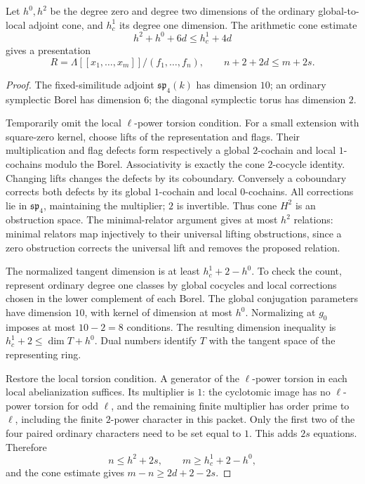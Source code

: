 \begin{srlemma}\label{lem:sr-four-presentation}
Let \(h^0,h^2\) be the degree zero and degree two dimensions of
the ordinary global-to-local adjoint cone, and \(h^1_c\) its
degree one dimension. The arithmetic cone estimate
\[
 h^2+h^0+6d\le h^1_c+4d
\]
gives a presentation
\[
 R=\Lambda[[x_1,\ldots,x_m]]/(f_1,\ldots,f_n),
 \qquad n+2+2d\le m+2s.
\]
\end{srlemma}
\begin{proof}
The fixed-similitude adjoint \(\mathfrak{sp}_4(k)\) has dimension
\(10\); an ordinary symplectic Borel has dimension \(6\);
the diagonal symplectic torus has dimension \(2\).

Temporarily omit the local \(\ell\)-power torsion condition.
For a small extension with square-zero kernel, choose lifts of
the representation and flags.
Their multiplication and flag defects form respectively a
global \(2\)-cochain and local \(1\)-cochains modulo the Borel.
Associativity is exactly the cone \(2\)-cocycle identity.
Changing lifts changes the defects by its coboundary.
Conversely a coboundary corrects both defects by its global
\(1\)-cochain and local \(0\)-cochains.
All corrections lie in \(\mathfrak{sp}_4\), maintaining the
multiplier; \(2\) is invertible.
Thus cone \(H^2\) is an obstruction space.
The minimal-relator argument gives at most \(h^2\) relations:
minimal relators map injectively to their universal lifting
obstructions, since a zero obstruction corrects the universal
lift and removes the proposed relation.

The normalized tangent dimension is at least \(h^1_c+2-h^0\).
To check the count, represent ordinary degree one classes by
global cocycles and local corrections chosen in the lower
complement of each Borel.
The global conjugation parameters have dimension \(10\), with
kernel of dimension at most \(h^0\).
Normalizing at \(g_0\) imposes at most \(10-2=8\) conditions.
The resulting dimension inequality is
\(h^1_c+2\le\dim T+h^0\).
Dual numbers identify \(T\) with the tangent space of the
representing ring.

Restore the local torsion condition. A generator of the
\(\ell\)-power torsion in each local abelianization suffices.
Its multiplier is \(1\): the cyclotomic image has no
\(\ell\)-power torsion for odd \(\ell\), and the remaining
finite multiplier has order prime to \(\ell\), including the
finite \(2\)-power character in this packet.
Only the first two of the four paired ordinary characters need
to be set equal to \(1\). This adds \(2s\) equations.
Therefore
\[
 n\le h^2+2s,\qquad m\ge h^1_c+2-h^0,
\]
and the cone estimate gives \(m-n\ge2d+2-2s\).


\end{proof}
